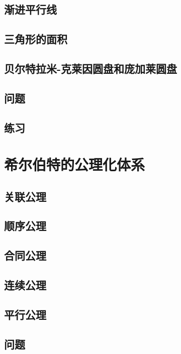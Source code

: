\documentclass[cn,fancy,blue,11pt]{elegantbook}
\begin{document}
\section{渐进平行线}

\section{三角形的面积}

\section{贝尔特拉米-克莱因圆盘和庞加莱圆盘}

\section{问题}

\section{练习}

\chapter{希尔伯特的公理化体系}

\section{关联公理}

\section{顺序公理}

\section{合同公理}

\section{连续公理}

\section{平行公理}

\section{问题}
\end{document}
